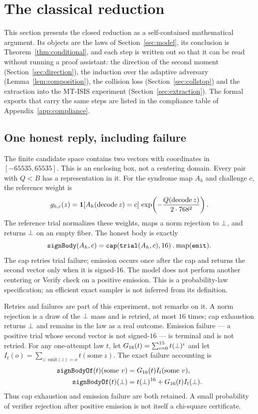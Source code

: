 \section{The classical reduction}\label{sec:reduction}
This section presents the closed reduction as a self-contained
mathematical argument. Its objects are the laws of
Section~\ref{sec:model}, its conclusion is
Theorem~\ref{thm:conditional}, and each step is written out so that it
can be read without running a proof assistant: the direction of the
second moment (Section~\ref{sec:direction}), the induction over the
adaptive adversary (Lemma~\ref{lem:composition}), the collision loss
(Section~\ref{sec:collstop}) and the extraction into the MT-ISIS
experiment (Section~\ref{sec:extraction}). The formal exports that
carry the same steps are listed in the compliance table of
Appendix~\ref{app:compliance}.

\subsection{One honest reply, including failure}
The finite candidate space  contains two vectors with
coordinates in $[-65535,65535]$. This is an enclosing box, not a
centering domain. Every pair with $Q<B$ has a representation in it.
For the syndrome map $A_h$ and challenge $c$, the reference weight is
\[
 g_{h,c}(z)=\mathbf{1}[A_h(\operatorname{decode}z)=c]\,
 \exp\!\left(-\frac{Q(\operatorname{decode}z)}{2\cdot768^2}\right).
\]
The reference trial normalizes these weights, maps a norm rejection to
$\bot$, and returns $\bot$ on an empty fiber. The honest body is
exactly
\[
 \code{signBody}(A_h,c)
 =\code{cap}(\code{trial}(A_h,c),16)\mathbin{.}\mathrm{map}(\code{emit}).
\]
The cap retries trial failure; emission occurs once after the cap and
returns the second vector only when it is signed-16. The model does
not perform another centering or Verify check on a positive emission.
This is a probability-law specification; an efficient exact sampler
is not inferred from its definition.

Retries and failures are part of this experiment, not remarks on it.
A norm rejection is a draw of the $\bot$ mass and is retried, at most
$16$ times; cap exhaustion returns $\bot$ and remains in the law as a
real outcome. Emission failure --- a positive trial whose second
vector is not signed-$16$ --- is terminal and is not retried. For any
one-attempt law $t$, let
$G_{16}(t)=\sum_{i=0}^{15}t(\bot)^i$ and let
$I_t(o)=\sum_{z:\,\mathrm{emit}(z)=o}t(\mathrm{some}\ z)$.
The exact failure accounting is
\begin{align*}
 \code{signBodyOf}(t)(\mathrm{some}\ v)&=G_{16}(t)I_t(\mathrm{some}\ v),\\
 \code{signBodyOf}(t)(\none)&=t(\none)^{16}+G_{16}(t)I_t(\none).
\end{align*}
Thus cap exhaustion and emission failure are both retained. A small
probability of verifier rejection after positive emission is not itself
a chi-square certificate.

